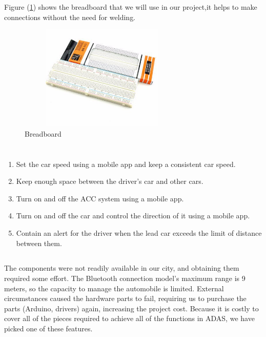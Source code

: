 \documentclass[12pt,a4paper]{report}
\begin{document}
Figure (\ref{fig:Breadboard}) shows the breadboard that we will use in our project,it helps to make connections without the need for welding.\\

\begin{figure}[H]
    \centering
    \graphicspath{ {./images/} }
    \includegraphics[width=8cm, height=5cm]{Breadboard.jpg}
    \caption{Breadboard}
    \label{fig:Breadboard}
\end{figure}








\section{\fontsize{12}{12}}
\subsection{\fontsize{12}{12}\selectfont{Specifications:}}
\renewcommand{\theenumi}{\roman{enumi}}%
\begin{enumerate}
  \item Set the car speed using a mobile app and keep a consistent car speed.
  \item Keep enough space between the driver's car and other cars.
  \item Turn on and off the ACC system using a mobile app.
  \item Turn on and off the car and control the direction of it using a mobile app.
  \item Contain an alert for the driver when the lead car exceeds the limit of distance between them.
\end{enumerate}

\subsection{\fontsize{12}{12}\selectfont{Constraints:}}
The components were not readily available in our city, and obtaining them required some effort. The Bluetooth connection model's maximum range is 9 meters, so the capacity to manage the automobile is limited. External circumstances caused the hardware parts to fail, requiring us to purchase the parts (Arduino, drivers) again, increasing the project cost. Because it is costly to cover all of the pieces required to achieve all of the functions in ADAS, we have picked one of these features.
\end{document}
